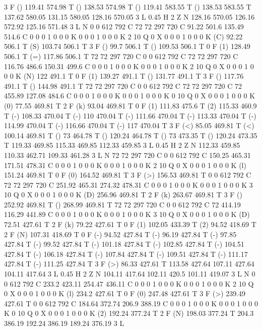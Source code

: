 3 F
() 119.41 574.98 T
() 138.53 574.98 T
() 119.41 583.55 T
() 138.53 583.55 T
137.62 580.05 131.15 580.05 128.16 570.05 3 L
0.45 H
2 Z
N
128.16 570.05 126.16 572.92 125.16 571.48 3 L
N
0 0 612 792 C
72 72 297 720 C
91.22 501.6 135.49 514.6 C
0 0 0 1 0 0 0 K
0 0 0 1 0 0 0 K
2 10 Q
0 X
0 0 0 1 0 0 0 K
(C) 92.22 506.1 T
(S) 103.74 506.1 T
3 F
() 99.7 506.1 T
() 109.53 506.1 T
0 F
(1) 128.49 506.1 T
(=) 117.86 506.1 T
72 72 297 720 C
0 0 612 792 C
72 72 297 720 C
116.76 486.6 150.31 499.6 C
0 0 0 1 0 0 0 K
0 0 0 1 0 0 0 K
2 10 Q
0 X
0 0 0 1 0 0 0 K
(N) 122 491.1 T
0 F
(1) 139.27 491.1 T
() 131.77 491.1 T
3 F
() 117.76 491.1 T
() 144.98 491.1 T
72 72 297 720 C
0 0 612 792 C
72 72 297 720 C
72 455.89 127.08 484.6 C
0 0 0 1 0 0 0 K
0 0 0 1 0 0 0 K
0 10 Q
0 X
0 0 0 1 0 0 0 K
(0) 77.55 469.81 T
2 F
(k) 93.04 469.81 T
0 F
(1) 111.83 475.6 T
(2) 115.33 460.9 T
(-) 108.33 470.04 T
(-) 110 470.04 T
(-) 111.66 470.04 T
(-) 113.33 470.04 T
(-) 114.99 470.04 T
(-) 116.66 470.04 T
(-) 117 470.04 T
3 F
(<) 85.05 469.81 T
(<) 100.14 469.81 T
() 73 464.78 T
() 120.24 464.78 T
() 73 473.35 T
() 120.24 473.35 T
119.33 469.85 115.33 469.85 112.33 459.85 3 L
0.45 H
2 Z
N
112.33 459.85 110.33 462.71 109.33 461.28 3 L
N
72 72 297 720 C
0 0 612 792 C
150.25 465.31 171.51 478.31 C
0 0 0 1 0 0 0 K
0 0 0 1 0 0 0 K
2 10 Q
0 X
0 0 0 1 0 0 0 K
(l) 151.24 469.81 T
0 F
(0) 164.52 469.81 T
3 F
(>) 156.53 469.81 T
0 0 612 792 C
72 72 297 720 C
251.92 465.31 274.32 478.31 C
0 0 0 1 0 0 0 K
0 0 0 1 0 0 0 K
3 10 Q
0 X
0 0 0 1 0 0 0 K
(D) 256.96 469.81 T
2 F
(k) 263.67 469.81 T
3 F
() 252.92 469.81 T
() 268.99 469.81 T
72 72 297 720 C
0 0 612 792 C
72 414.19 116.29 441.89 C
0 0 0 1 0 0 0 K
0 0 0 1 0 0 0 K
3 10 Q
0 X
0 0 0 1 0 0 0 K
(D) 72.51 427.61 T
2 F
(k) 79.22 427.61 T
0 F
(1) 102.05 433.39 T
(2) 94.52 418.69 T
2 F
(N) 107.31 418.69 T
0 F
(-) 94.52 427.84 T
(-) 96.19 427.84 T
(-) 97.85 427.84 T
(-) 99.52 427.84 T
(-) 101.18 427.84 T
(-) 102.85 427.84 T
(-) 104.51 427.84 T
(-) 106.18 427.84 T
(-) 107.84 427.84 T
(-) 109.51 427.84 T
(-) 111.17 427.84 T
(-) 111.25 427.84 T
3 F
(>) 86.33 427.61 T
113.58 427.64 107.11 427.64 104.11 417.64 3 L
0.45 H
2 Z
N
104.11 417.64 102.11 420.5 101.11 419.07 3 L
N
0 0 612 792 C
233.2 423.11 254.47 436.11 C
0 0 0 1 0 0 0 K
0 0 0 1 0 0 0 K
2 10 Q
0 X
0 0 0 1 0 0 0 K
(l) 234.2 427.61 T
0 F
(0) 247.48 427.61 T
3 F
(>) 239.49 427.61 T
0 0 612 792 C
184.64 372.74 206.9 388.19 C
0 0 0 1 0 0 0 K
0 0 0 1 0 0 0 K
0 10 Q
0 X
0 0 0 1 0 0 0 K
(2) 192.24 377.24 T
2 F
(N) 198.03 377.24 T
204.3 386.19 192.24 386.19 189.24 376.19 3 L
